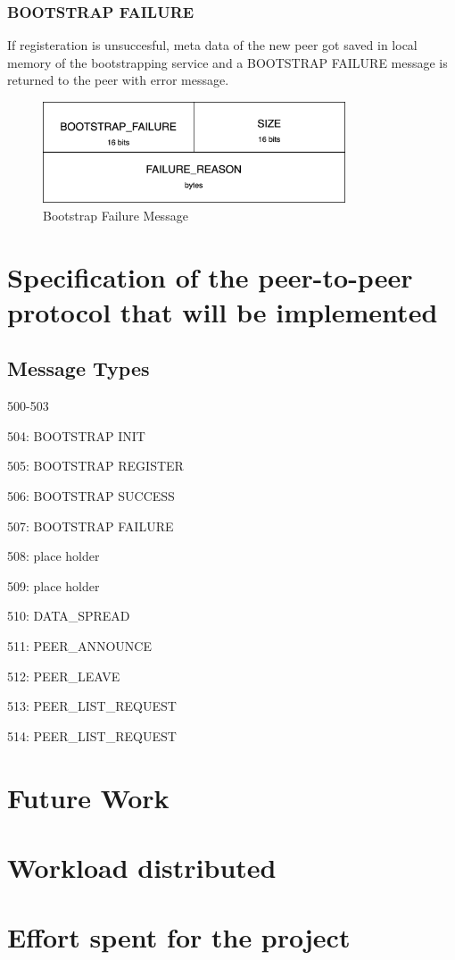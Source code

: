 \subsubsection{BOOTSTRAP FAILURE}
If registeration is unsuccesful, meta data of the new peer got saved in local memory of the bootstrapping service and a BOOTSTRAP FAILURE message is returned to the peer with error message. 

\begin{figure}[H]
    \centering
    \includegraphics[width=0.8\textwidth]{pics/bootstrap.failure.png}
    \caption{Bootstrap Failure Message}
\end{figure}




\section{Specification of the peer-to-peer protocol that will be implemented}

\subsection{Message Types}

500-503

504: BOOTSTRAP INIT

505: BOOTSTRAP REGISTER

506: BOOTSTRAP SUCCESS

507: BOOTSTRAP FAILURE


508: place holder

509: place holder


510: DATA\_SPREAD

511: PEER\_ANNOUNCE

512: PEER\_LEAVE

513: PEER\_LIST\_REQUEST

514: PEER\_LIST\_REQUEST


\section{Future Work}

\section{Workload distributed}

\section{Effort spent for the project}